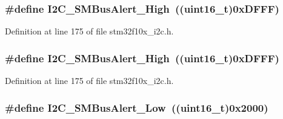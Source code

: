 \subsubsection[{\texorpdfstring{I2\+C\+\_\+\+S\+M\+Bus\+Alert\+\_\+\+High}{I2C_SMBusAlert_High}}]{\setlength{\rightskip}{0pt plus 5cm}\#define I2\+C\+\_\+\+S\+M\+Bus\+Alert\+\_\+\+High~(({\bf uint16\+\_\+t})0x\+D\+F\+F\+F)}\hypertarget{group___i2_c___s_m_bus__alert__pin__level_gac3ab64f43ef90f0f83f9c88981aaa862}{}\label{group___i2_c___s_m_bus__alert__pin__level_gac3ab64f43ef90f0f83f9c88981aaa862}


Definition at line 175 of file stm32f10x\+\_\+i2c.\+h.

\subsubsection[{\texorpdfstring{I2\+C\+\_\+\+S\+M\+Bus\+Alert\+\_\+\+High}{I2C_SMBusAlert_High}}]{\setlength{\rightskip}{0pt plus 5cm}\#define I2\+C\+\_\+\+S\+M\+Bus\+Alert\+\_\+\+High~(({\bf uint16\+\_\+t})0x\+D\+F\+F\+F)}\hypertarget{group___i2_c___s_m_bus__alert__pin__level_gac3ab64f43ef90f0f83f9c88981aaa862}{}\label{group___i2_c___s_m_bus__alert__pin__level_gac3ab64f43ef90f0f83f9c88981aaa862}


Definition at line 175 of file stm32f10x\+\_\+i2c.\+h.

\subsubsection[{\texorpdfstring{I2\+C\+\_\+\+S\+M\+Bus\+Alert\+\_\+\+Low}{I2C_SMBusAlert_Low}}]{\setlength{\rightskip}{0pt plus 5cm}\#define I2\+C\+\_\+\+S\+M\+Bus\+Alert\+\_\+\+Low~(({\bf uint16\+\_\+t})0x2000)}\hypertarget{group___i2_c___s_m_bus__alert__pin__level_ga6f923166107afb8aad1d7d1a87048d6e}{}\label{group___i2_c___s_m_bus__alert__pin__level_ga6f923166107afb8aad1d7d1a87048d6e}


